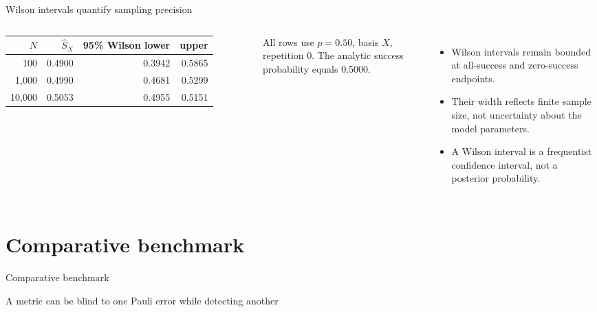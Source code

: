 \documentclass[10pt,aspectratio=169]{beamer}
\newcommand{\sourcefoot}[1]{}
\begin{document}
\begin{frame}[t]{Wilson intervals quantify sampling precision}
\begin{columns}[T]
\begin{tabular}{@{}rrrr@{}}
\toprule
$N$ & $\widehat S_X$ & 95\% Wilson lower & upper\\
\midrule
100 & 0.4900 & 0.3942 & 0.5865\\
1,000 & 0.4990 & 0.4681 & 0.5299\\
10,000 & 0.5053 & 0.4955 & 0.5151\\
\bottomrule
\end{tabular}
\vspace{2mm}
\small All rows use $p=0.50$, basis $X$, repetition 0. The analytic success probability equals 0.5000.
\begin{itemize}
  \item Wilson intervals remain bounded at all-success and zero-success endpoints.
  \item Their width reflects finite sample size, not uncertainty about the model parameters.
  \item A Wilson interval is a frequentist confidence interval, not a posterior probability.
\end{itemize}
\end{columns}
\sourcefoot{Exact displayed values from \texttt{experiments/finite\_shot\_sweep.csv}; interval implementation in \texttt{src/finite\_shot\_phase\_error.py}.}
\end{frame}

\section{Comparative benchmark}
\begin{frame}[plain]
\vfill\centering
{\color{quantumblue}\LARGE Comparative benchmark}\par\vspace{3mm}
\large A metric can be blind to one Pauli error while detecting another
\vfill
\end{frame}
\end{document}
